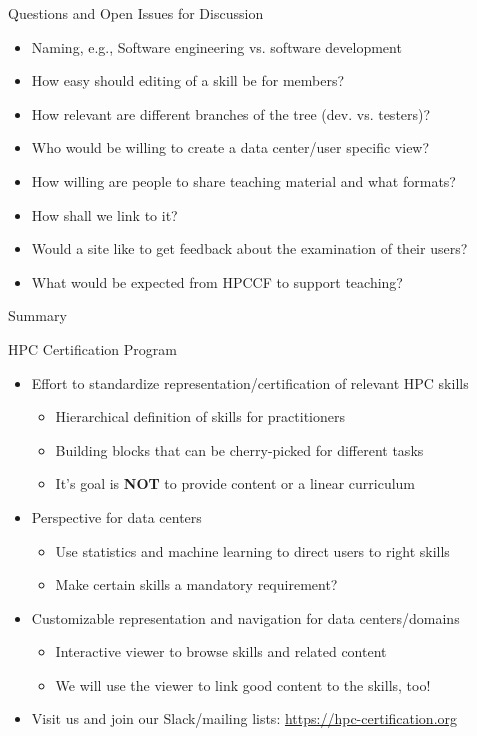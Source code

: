 \documentclass[compress,aspectratio=169]{beamer}
\begin{document}
\begin{frame}{Questions and Open Issues for Discussion}
	\begin{itemize}
		\item Naming, e.g., Software engineering vs. software development
		\item How easy should editing of a skill be for members?
		\item How relevant are different branches of the tree (dev. vs. testers)?
		\item Who would be willing to create a data center/user specific view?
		\item How willing are people to share teaching material and what formats?
		\item How shall we link to it?
		\item Would a site like to get feedback about the examination of their users?
		\item What would be expected from HPCCF to support teaching?
	\end{itemize}

\end{frame}


\begin{frame}{Summary}

	\begin{block}{HPC Certification Program}
		\begin{itemize}
			\item Effort to standardize representation/certification of relevant HPC skills
      \begin{itemize}
        \item Hierarchical definition of skills for practitioners
        \item Building blocks that can be cherry-picked for different tasks
				\item It's goal is \textbf{NOT} to provide content or a linear curriculum
      \end{itemize}
			\item Perspective for data centers
				\begin{itemize}
					\item Use statistics and machine learning to direct users to right skills
					\item Make certain skills a mandatory requirement?
				\end{itemize}
			\item Customizable representation and navigation for data centers/domains
      \begin{itemize}
        \item Interactive viewer to browse skills and related content
				\item We will use the viewer to link good content to the skills, too!
      \end{itemize}
      \item Visit us and join our Slack/mailing lists: \url{https://hpc-certification.org}
		\end{itemize}
	\end{block}
\end{frame}
\end{document}
